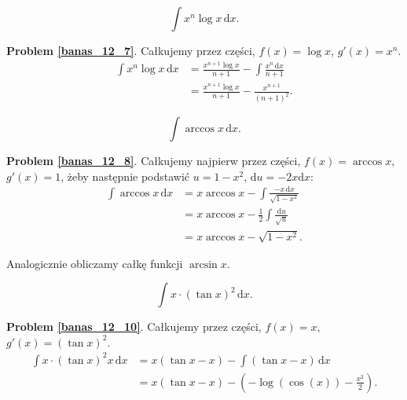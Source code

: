 \begin{problem_with_solution}
    \label{banas_12_7}%
    \begin{equation}
        \int x^n \log x \,\mathrm{d} x.
    \end{equation}
\end{problem_with_solution}

\textbf{Problem \ref{banas_12_7}}.
Całkujemy przez części, $f(x) = \log x$, $g'(x) = x^n$.
\begin{align}
    \int x^n \log x \, \mathrm{d} x & = \frac{x^{n+1} \log x}{n+1} - \int \frac{x^n \,\mathrm{d} x}{n+1} \\
                                    & = \frac{x^{n+1} \log x}{n+1} - \frac{x^{n+1}}{(n+1)^2}.
\end{align}

\begin{problem_with_solution}
    \label{banas_12_8}%
    \begin{equation}
        \int \arccos x \,\mathrm{d} x.
    \end{equation}
\end{problem_with_solution}

\textbf{Problem \ref{banas_12_8}}.
Całkujemy najpierw przez części, $f(x) = \arccos x$, $g'(x) = 1$, żeby następnie podstawić $u = 1 - x^2$, $\mathrm{d} u = -2x \mathrm{d}x$:
\begin{align}
    \int \arccos x \, \mathrm{d} x & = x \arccos x - \int  \frac{-x \,\mathrm{d}x}{\sqrt{1-x^2}} \\
    & = x \arccos x - \frac 12 \int \frac {\mathrm{d}u}{\sqrt{u}} \\
    & = x \arccos x - \sqrt{1 - x^2}.
\end{align}

Analogicznie obliczamy całkę funkcji $\arcsin x$.

\begin{problem_with_solution}
    \label{banas_12_10}%
    \begin{equation}
        \int x \cdot (\tan x)^2 \,\mathrm{d} x.
    \end{equation}
\end{problem_with_solution}

\textbf{Problem \ref{banas_12_10}}.
Całkujemy przez części, $f(x) = x$, $g'(x) = (\tan x)^2$.
\begin{align}
    \int x \cdot (\tan x)^2 x \, \mathrm{d} x & = x (\tan x - x) - \int (\tan x - x) \,\mathrm{d}x \\
    & = x (\tan x - x) - \left(-\log(\cos(x)) - \frac{x^2}{2}\right).
\end{align}

